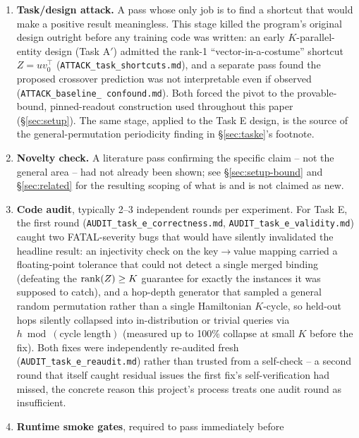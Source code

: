 \begin{enumerate}
\setlength\itemsep{2pt}
\item \textbf{Task/design attack.} A pass whose only job is to find a
      shortcut that would make a positive result meaningless. This stage
      killed the program's original design outright before any training
      code was written: an early $K$-parallel-entity design (Task
      A$'$) admitted the rank-1 ``vector-in-a-costume'' shortcut
      $Z=uv_0^\top$ (\texttt{ATTACK\_task\_shortcuts.md}), and a
      separate pass found the proposed crossover prediction was not
      interpretable even if observed (\texttt{ATTACK\_baseline\_
      confound.md}). Both forced the pivot to the provable-bound,
      pinned-readout construction used throughout this paper
      (\S\ref{sec:setup}). The same stage, applied to the Task E design,
      is the source of the general-permutation periodicity finding in
      \S\ref{sec:taske}'s footnote.
\item \textbf{Novelty check.} A literature pass confirming the specific
      claim -- not the general area -- had not already been shown; see
      \S\ref{sec:setup-bound} and \S\ref{sec:related} for the resulting
      scoping of what is and is not claimed as new.
\item \textbf{Code audit}, typically 2--3 independent rounds per
      experiment. For Task E, the first round
      (\texttt{AUDIT\_task\_e\_correctness.md},
      \texttt{AUDIT\_task\_e\_validity.md}) caught two FATAL-severity
      bugs that would have silently invalidated the headline result: an
      injectivity check on the key$\to$value mapping carried a
      floating-point tolerance that could not detect a single merged
      binding (defeating the $\operatorname{rank}(Z)\geq K$ guarantee for exactly the
      instances it was supposed to catch), and a hop-depth generator that
      sampled a general random permutation rather than a single
      Hamiltonian $K$-cycle, so held-out hops silently collapsed into
      in-distribution or trivial queries via $h\bmod(\text{cycle
      length})$ (measured up to 100\% collapse at small $K$ before the
      fix). Both fixes were independently re-audited fresh
      (\texttt{AUDIT\_task\_e\_reaudit.md}) rather than trusted from a
      self-check -- a second round that itself caught residual issues
      the first fix's self-verification had missed, the concrete reason
      this project's process treats one audit round as insufficient.
\item \textbf{Runtime smoke gates}, required to pass immediately before

\end{enumerate}
